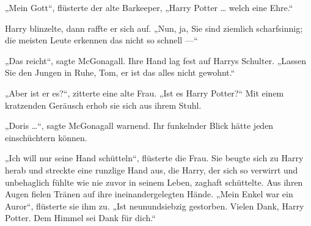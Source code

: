 „Mein Gott“, flüsterte der alte Barkeeper,
„Harry Potter … welch eine Ehre.“

Harry blinzelte, dann raffte er sich auf.
„Nun, ja, Sie sind ziemlich scharfsinnig; die meisten Leute erkennen das nicht so schnell —“

„Das reicht“, sagte McGonagall. Ihre Hand lag fest auf Harrys Schulter.
„Lassen Sie den Jungen in Ruhe, Tom, er ist das alles nicht gewohnt.“

„Aber ist er es?“, zitterte eine alte Frau.
„Ist es Harry Potter?“ Mit einem kratzenden Geräusch erhob sie sich aus ihrem Stuhl.

„Doris …“, sagte McGonagall warnend. Ihr funkelnder Blick hätte jeden einschüchtern können.

„Ich will nur seine Hand schütteln“, flüsterte die Frau. Sie beugte sich zu Harry herab und streckte eine runzlige Hand aus, die Harry, der sich so verwirrt und unbehaglich fühlte wie nie zuvor in seinem Leben, zaghaft schüttelte. Aus ihren Augen fielen Tränen auf ihre ineinandergelegten Hände.
„Mein Enkel war ein Auror“, flüsterte sie ihm zu.
„Ist neunundsiebzig gestorben. Vielen Dank, Harry Potter. Dem Himmel sei Dank für dich.“

